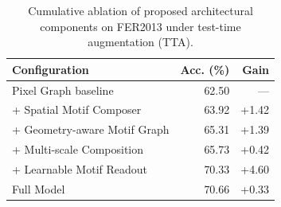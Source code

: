 \begin{table}[htbp]
\centering
\caption{Cumulative ablation of proposed architectural components on FER2013 under test-time augmentation (TTA).}
\label{tab:cumulative_ablation}
\begin{tabular}{lrr}
\toprule
\textbf{Configuration} & \textbf{Acc. (\%)} & \textbf{Gain} \\
\midrule
Pixel Graph baseline & 62.50 & --- \\
+ Spatial Motif Composer & 63.92 & +1.42 \\
+ Geometry-aware Motif Graph & 65.31 & +1.39 \\
+ Multi-scale Composition & 65.73 & +0.42 \\
+ Learnable Motif Readout & 70.33 & +4.60 \\
Full Model & 70.66 & +0.33 \\
\bottomrule
\end{tabular}
\end{table}
